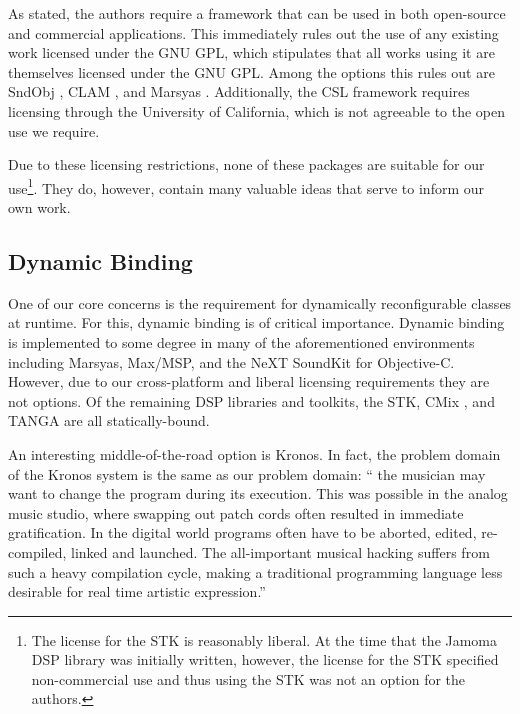 \documentclass[twoside,10pt]{article}
\begin{document}
As stated, the authors require a framework that can be used in both open-source and commercial applications.  This immediately rules out the use of any existing work licensed under the GNU GPL, which stipulates that all works using it are themselves licensed under the GNU GPL.  Among the options this rules out are SndObj \cite{Lazzarini:2001}, CLAM \cite{Amatraian:2008}, and Marsyas \cite{Tzanetakis:2008}.  Additionally, the CSL framework \cite{Pope:2003} requires licensing through the University of California, which is not agreeable to the open use we require.

Due to these licensing restrictions, none of these packages are suitable for our use\footnote{The license for the STK is reasonably liberal.  At the time that the Jamoma DSP library was initially written, however, the license for the STK specified non-commercial use and thus using the STK was not an option for the authors.}.  They do, however, contain many valuable ideas that serve to inform our own work.



\subsection{Dynamic Binding} %

One of our core concerns is the requirement for dynamically reconfigurable classes at runtime.  For this, dynamic binding is of critical importance.  Dynamic binding is implemented to some degree in many of the aforementioned environments including Marsyas, Max/MSP, and the NeXT SoundKit for Objective-C.  However, due to our cross-platform and liberal licensing requirements they are not options.  Of the remaining DSP libraries and toolkits, the STK\cite{Cook:1999}, CMix \cite{Lansky:1990}, and TANGA \cite{Reiter:2007} are all statically-bound.  

An interesting middle-of-the-road option is Kronos.  In fact, the problem domain of the Kronos system is the same as our problem domain: `` the musician may want to change the program during its execution. This was possible in the analog music studio, where swapping out patch cords often resulted in immediate gratification. In the digital world programs often have to be aborted, edited, re-compiled, linked and launched. The all-important musical hacking suffers from such a heavy compilation cycle, making a traditional programming language less desirable for real time artistic expression.'' \cite{Norilo:2009}
\end{document}
